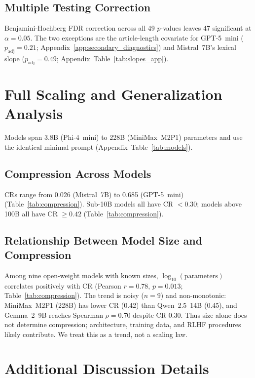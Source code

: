\documentclass[11pt]{article}
\begin{document}
\subsection{Multiple Testing Correction}

Benjamini-Hochberg FDR correction across all 49 $p$-values leaves 47
significant at $\alpha = 0.05$. The two exceptions are the
article-length covariate for GPT-5~mini ($p_{\text{adj}} = 0.21$;
Appendix~\ref{app:secondary_diagnostics}) and Mistral~7B's lexical slope
($p_{\text{adj}} = 0.49$; Appendix~Table~\ref{tab:slopes_app}).



\section{Full Scaling and Generalization Analysis}
\label{app:multimodel_full}

Models span 3.8B (Phi-4~mini) to 228B (MiniMax~M2P1) parameters and use
the identical minimal prompt (Appendix~Table~\ref{tab:models}).

\subsection{Compression Across Models}

CRs range from 0.026 (Mistral~7B) to 0.685 (GPT-5~mini)
(Table~\ref{tab:compression}). Sub-10B models all have CR $<0.30$;
models above 100B all have CR $\geq0.42$ (Table~\ref{tab:compression}).

\subsection{Relationship Between Model Size and Compression}

Among nine open-weight models with known sizes, $\log_{10}(\text{parameters})$
correlates positively with CR (Pearson $r=0.78$, $p=0.013$;
Table~\ref{tab:compression}). The trend is noisy ($n=9$) and
non-monotonic: MiniMax~M2P1 (228B) has lower CR (0.42) than Qwen~2.5~14B
(0.45), and Gemma~2~9B reaches Spearman $\rho=0.70$ despite CR 0.30.
Thus size alone does not determine compression; architecture, training
data, and RLHF procedures~\citep{rafailov2023direct} likely contribute.
We treat this as a trend, not a scaling law.



\section{Additional Discussion Details}
\label{app:discussion_details}
\end{document}

